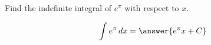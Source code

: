 \documentclass{ximera}
\author{Gregory Hartman \and Matthew Carr}
\begin{document}
\begin{exercise}


Find the indefinite integral of $e^{\pi}$ with respect to $x$.

\[
\int e^{\pi}\d x=\answer{e^{\pi} x+C}
\]


\end{exercise}
\end{document}
